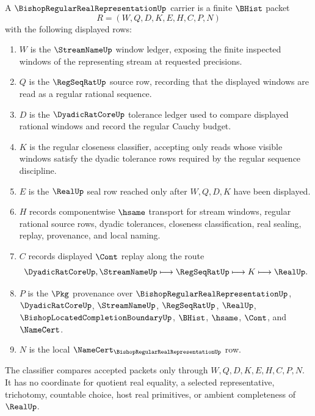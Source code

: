 \begin{definition}
\label{def:bishop-regular-real-representation-carrier}
A $\BishopRegularRealRepresentationUp$ carrier is a finite $\BHist$ packet
$$
R=(W,Q,D,K,E,H,C,P,N)
$$
with the following displayed rows:
\begin{enumerate}
\item $W$ is the $\StreamNameUp$ window ledger, exposing the finite inspected windows of the representing stream at requested precisions.
\item $Q$ is the $\RegSeqRatUp$ source row, recording that the displayed windows are read as a regular rational sequence.
\item $D$ is the $\DyadicRatCoreUp$ tolerance ledger used to compare displayed rational windows and record the regular Cauchy budget.
\item $K$ is the regular closeness classifier, accepting only reads whose visible windows satisfy the dyadic tolerance rows required by the regular sequence discipline.
\item $E$ is the $\RealUp$ seal row reached only after $W,Q,D,K$ have been displayed.
\item $H$ records componentwise $\hsame$ transport for stream windows, regular rational source rows, dyadic tolerances, closeness classification, real sealing, replay, provenance, and local naming.
\item $C$ records displayed $\Cont$ replay along the route
$$
\DyadicRatCoreUp,\StreamNameUp \longmapsto \RegSeqRatUp \longmapsto K \longmapsto \RealUp .
$$
\item $P$ is the $\Pkg$ provenance over $\BishopRegularRealRepresentationUp$, $\DyadicRatCoreUp$, $\StreamNameUp$, $\RegSeqRatUp$, $\RealUp$, $\BishopLocatedCompletionBoundaryUp$, $\BHist$, $\hsame$, $\Cont$, and $\NameCert$.
\item $N$ is the local $\NameCert_{\BishopRegularRealRepresentationUp}$ row.
\end{enumerate}
The classifier compares accepted packets only through $W,Q,D,K,E,H,C,P,N$. It has no coordinate for quotient real equality, a selected representative, trichotomy, countable choice, host real primitives, or ambient completeness of $\RealUp$.
\end{definition}

